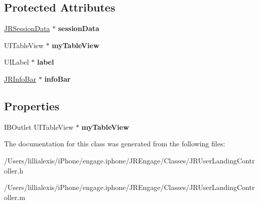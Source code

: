 \subsection*{Protected Attributes}
\begin{DoxyCompactItemize}
\item 
\hypertarget{interface_j_r_user_landing_controller_aedfc555e72b54c083be3238129586f55}{
\hyperlink{interface_j_r_session_data}{JRSessionData} $\ast$ {\bfseries sessionData}}
\label{interface_j_r_user_landing_controller_aedfc555e72b54c083be3238129586f55}

\item 
\hypertarget{interface_j_r_user_landing_controller_ac9de7ca0035d352634579009375869e7}{
UITableView $\ast$ {\bfseries myTableView}}
\label{interface_j_r_user_landing_controller_ac9de7ca0035d352634579009375869e7}

\item 
\hypertarget{interface_j_r_user_landing_controller_a922f1178532a4cc04ee915888e016ee4}{
UILabel $\ast$ {\bfseries label}}
\label{interface_j_r_user_landing_controller_a922f1178532a4cc04ee915888e016ee4}

\item 
\hypertarget{interface_j_r_user_landing_controller_aa094c72f54d25eea2c7188a285403ffe}{
\hyperlink{interface_j_r_info_bar}{JRInfoBar} $\ast$ {\bfseries infoBar}}
\label{interface_j_r_user_landing_controller_aa094c72f54d25eea2c7188a285403ffe}

\end{DoxyCompactItemize}
\subsection*{Properties}
\begin{DoxyCompactItemize}
\item 
\hypertarget{interface_j_r_user_landing_controller_a08f4a837e00a446ccf5504d10c07da75}{
IBOutlet UITableView $\ast$ {\bfseries myTableView}}
\label{interface_j_r_user_landing_controller_a08f4a837e00a446ccf5504d10c07da75}

\end{DoxyCompactItemize}


The documentation for this class was generated from the following files:\begin{DoxyCompactItemize}
\item 
/Users/lillialexis/iPhone/engage.iphone/JREngage/Classes/JRUserLandingController.h\item 
/Users/lillialexis/iPhone/engage.iphone/JREngage/Classes/JRUserLandingController.m\end{DoxyCompactItemize}
